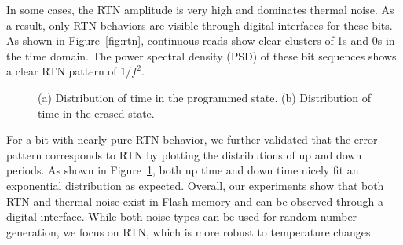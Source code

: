 In some cases, the RTN amplitude is very high and dominates thermal noise. As a result, only RTN behaviors are visible through digital interfaces for these bits. As shown in Figure~\ref{fig:rtn}, continuous reads show clear clusters of 1s and 0s in the time domain. The power spectral density (PSD) of these bit sequences shows a clear RTN pattern of $1/{f}^2$. 

 
\begin{figure}
  \centering
  
  \caption{(a) Distribution of time in the programmed state. 
(b) Distribution of time in the erased state.}
  \label{fig:rtn_freq}
\end{figure}


For a bit with nearly pure RTN behavior, we further validated that the error pattern corresponds to RTN by plotting the distributions of up and down periods. As shown in Figure~\ref{fig:rtn_freq}, both up time and down time nicely fit an exponential distribution as expected. Overall, our experiments show that both RTN and thermal noise exist in Flash memory and can be observed through a digital interface. While both noise types can be used for random number generation, we focus on RTN, which is more robust to temperature changes.

